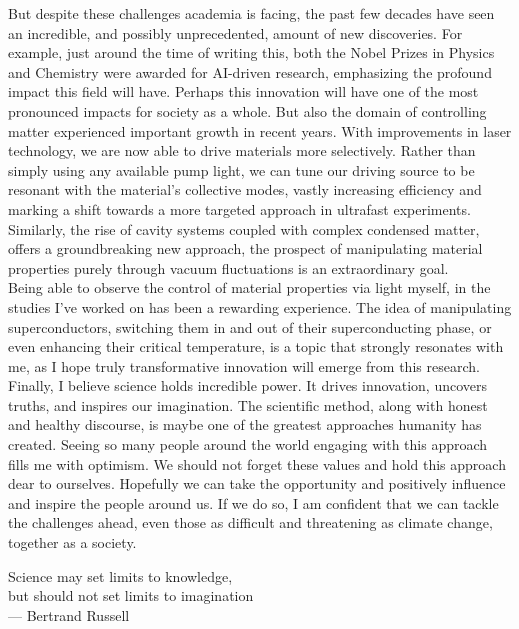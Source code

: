 But despite these challenges academia is facing, the past few decades have seen an incredible, and possibly unprecedented, amount of new discoveries.
For example, just around the time of writing this, both the Nobel Prizes in Physics and Chemistry were awarded for AI-driven research, emphasizing the profound impact this field will have.
Perhaps this innovation will have one of the most pronounced impacts for society as a whole.
But also the domain of controlling matter experienced important growth in recent years.
With improvements in laser technology, we are now able to drive materials more selectively.
Rather than simply using any available pump light, we can tune our driving source to be resonant with the material’s collective modes, vastly increasing efficiency and marking a shift towards a more targeted approach in ultrafast experiments.\\
Similarly, the rise of cavity systems coupled with complex condensed matter, offers a groundbreaking new approach, the prospect of manipulating material properties purely through vacuum fluctuations is an extraordinary goal.\\
Being able to observe the control of material properties via light myself, in the studies I’ve worked on has been a rewarding experience.
The idea of manipulating superconductors, switching them in and out of their superconducting phase, or even enhancing their critical temperature, is a topic that strongly resonates with me, as I hope truly transformative innovation will emerge from this research.\\

Finally, I believe science holds incredible power.
It drives innovation, uncovers truths, and inspires our imagination.
The scientific method, along with honest and healthy discourse, is maybe one of the greatest approaches humanity has created.
Seeing so many people around the world engaging with this approach fills me with optimism.
We should not forget these values and hold this approach dear to ourselves.
Hopefully we can take the opportunity and positively influence and inspire the people around us.
If we do so, I am confident that we can tackle the challenges ahead, even those as difficult and threatening as climate change, together as a society.


\vspace*{3cm}

\begin{raggedleft}
	Science may set limits to knowledge,\\
	but should not set limits to imagination\\
	--- Bertrand Russell\\
\end{raggedleft}
